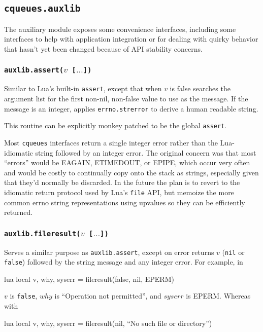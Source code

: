 \documentclass[11pt, oneside]{memoir}
\newcommand*{\cqueues}[0]{\texttt{cqueues}\xspace}
\newcommand*{\fn}[1]{\texttt{#1}\xspace}
\newcommand*{\false}[0]{\texttt{false}\xspace}
\newcommand*{\nil}[0]{\texttt{nil}\xspace}
\newcounter{toccols}
\newenvironment{Module}[1]{
	\subsection{\texttt{#1}}
	\addtocontents{toc}{
		\protect\begin{multicols}{\value{toccols}}
	}
}{
	\addtocontents{toc}{\protect\end{multicols}}
}
\begin{document}
\begin{Module}{cqueues.auxlib}

The auxiliary module exposes some convenience interfaces, including some interfaces to help with application integration or for dealing with quirky behavior that hasn't yet been changed because of API stability concerns.

\subsubsection[\fn{auxlib.assert}]{\fn{auxlib.assert($v$ [$\ldots$])}}

Similar to Lua's built-in \fn{assert}, except that when $v$ is false searches the argument list for the first non-nil, non-false value to use as the message. If the message is an integer, applies \fn{errno.strerror} to derive a human readable string.

This routine can be explicitly monkey patched to be the global \fn{assert}.

Most \cqueues interfaces return a single integer error rather than the Lua-idiomatic string followed by an integer error. The original concern was that most ``errors'' would be EAGAIN, ETIMEDOUT, or EPIPE, which occur very often and would be costly to continually copy onto the stack as strings, especially given that they'd normally be discarded. In the future the plan is to revert to the idiomatic return protocol used by Lua's \fn{file} API, but memoize the more common errno string representations using upvalues so they can be efficiently returned.


\subsubsection[\fn{auxlib.fileresult}]{\fn{auxlib.fileresult($v$ [$\ldots$])}}

Serves a similar purpose as \fn{auxlib.assert}, except on error returns $v$ (\nil or \false) followed by the string message and any integer error. For example, in

\begin{example}{lua}
	local v, why, syserr = fileresult(false, nil, EPERM)
\end{example}

$v$ is \false, $why$ is ``Operation not permitted'', and $syserr$ is EPERM. Whereas with

\begin{example}{lua}
	local v, why, syserr = fileresult(nil, ``No such file or directory'')
\end{example}


\end{Module}
\end{document}
